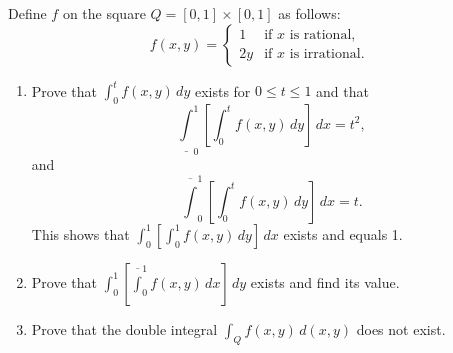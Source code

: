 \begin{problembox}
Define \( f \) on the square \( Q = [0, 1] \times [0, 1] \) as follows:
\[ f(x, y) = 
\begin{cases} 
1 & \text{if } x \text{ is rational}, \\
2y & \text{if } x \text{ is irrational}. 
\end{cases} \]
\begin{enumerate}[label=(\alph*)]
    \item Prove that \( \int_{0}^{t} f(x, y) \, dy \) exists for \( 0 \leq t \leq 1 \) and that
    \[ \underline\int_{0}^{1} \left[ \int_{0}^{t} f(x, y) \, dy \right] \, dx = t^2, \]
    and \[ \overline\int_{0}^{1} \left[ \int_{0}^{t} f(x, y) \, dy \right] \, dx = t. \]
    This shows that \( \int_{0}^{1} \left[ \int_{0}^{1} f(x, y) \, dy \right] \, dx \) exists and equals 1.
    
    \item Prove that \( \int_{0}^{1} \left[ \overline\int_{0}^{1} f(x, y) \, dx \right] \, dy \) exists and find its value.
    \item Prove that the double integral \( \int_{Q} f(x, y) \, d(x, y) \) does not exist.
\end{enumerate}
\end{problembox}



